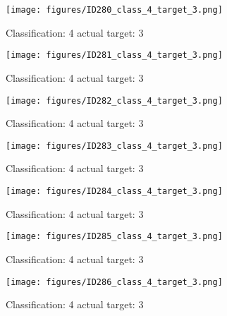 \begin{figure}[h!]
\begin{center}
\texttt{[image: figures/ID280\_class\_4\_target\_3.png]}
\end{center}
\caption{ Classification: 4 actual target: 3}
\label{fig:ID280_class_4_target_3}
\end{figure}
\begin{figure}[h!]
\begin{center}
\texttt{[image: figures/ID281\_class\_4\_target\_3.png]}
\end{center}
\caption{ Classification: 4 actual target: 3}
\label{fig:ID281_class_4_target_3}
\end{figure}
\begin{figure}[h!]
\begin{center}
\texttt{[image: figures/ID282\_class\_4\_target\_3.png]}
\end{center}
\caption{ Classification: 4 actual target: 3}
\label{fig:ID282_class_4_target_3}
\end{figure}
\begin{figure}[h!]
\begin{center}
\texttt{[image: figures/ID283\_class\_4\_target\_3.png]}
\end{center}
\caption{ Classification: 4 actual target: 3}
\label{fig:ID283_class_4_target_3}
\end{figure}
\begin{figure}[h!]
\begin{center}
\texttt{[image: figures/ID284\_class\_4\_target\_3.png]}
\end{center}
\caption{ Classification: 4 actual target: 3}
\label{fig:ID284_class_4_target_3}
\end{figure}
\begin{figure}[h!]
\begin{center}
\texttt{[image: figures/ID285\_class\_4\_target\_3.png]}
\end{center}
\caption{ Classification: 4 actual target: 3}
\label{fig:ID285_class_4_target_3}
\end{figure}
\begin{figure}[h!]
\begin{center}
\texttt{[image: figures/ID286\_class\_4\_target\_3.png]}
\end{center}
\caption{ Classification: 4 actual target: 3}
\label{fig:ID286_class_4_target_3}
\end{figure}
